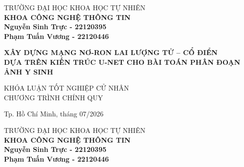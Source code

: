 \begin{titlepage}

\begin{center}
TRƯỜNG ĐẠI HỌC KHOA HỌC TỰ NHIÊN\\
\textbf{KHOA CÔNG NGHỆ THÔNG TIN}\\[2cm]


{ \Large \bfseries Nguyễn Sinh Trực - 22120395 \\ Phạm Tuấn Vương - 22120446\\[2cm] } 


{ \Large \bfseries XÂY DỰNG MẠNG NƠ-RON LAI LƯỢNG TỬ -- CỔ ĐIỂN \\ DỰA TRÊN KIẾN TRÚC U-NET CHO BÀI TOÁN PHÂN ĐOẠN ẢNH Y SINH \\[3cm]}


\large KHÓA LUẬN TỐT NGHIỆP CỬ NHÂN\\
\large CHƯƠNG TRÌNH CHÍNH QUY\\



\vfill
Tp. Hồ Chí Minh, tháng 07/2026

\end{center}

\pagebreak



\begin{center}

TRƯỜNG ĐẠI HỌC KHOA HỌC TỰ NHIÊN\\
\textbf{KHOA CÔNG NGHỆ THÔNG TIN}\\[2cm]


{\large \bfseries Nguyễn Sinh Trực - 22120395 \\ Phạm Tuấn Vương - 22120446\\} 



\end{center}
\end{titlepage}
